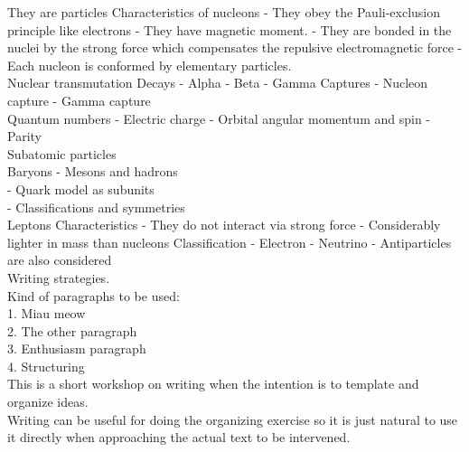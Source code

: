 \documentclass[openany]{book}
\begin{document}

They are particles
Characteristics of nucleons
-	They obey the Pauli-exclusion principle like electrons
- 	They have magnetic moment.
-	They are bonded in the nuclei by the strong force which compensates the repulsive electromagnetic force
-	Each nucleon is conformed by elementary particles. \\

Nuclear transmutation 
Decays
-	Alpha 
-	Beta
-	Gamma 
Captures 
-	Nucleon capture
-	Gamma capture \\ 

Quantum numbers
-	Electric charge
-	Orbital angular momentum and spin 
-	Parity \\ 

Subatomic particles  \\

Baryons 
-	Mesons and hadrons  \\
-	Quark model as subunits  \\
- 	Classifications and symmetries \\

Leptons 
Characteristics
-	They do not interact via strong force
-	Considerably lighter in mass than nucleons
Classification 
-	Electron 
-	Neutrino 
-	Antiparticles are also considered \\ 

Writing strategies. \\

Kind of paragraphs to be used:  \\

1.	Miau meow \\
2.	The other paragraph  \\
3.	Enthusiasm paragraph  \\
4.	Structuring \\

This is a short workshop on writing when the intention is to template and organize ideas.  \\

Writing can be useful for doing the organizing exercise so it is just natural to use it directly when approaching the actual text to be intervened.  \\
\end{document}

